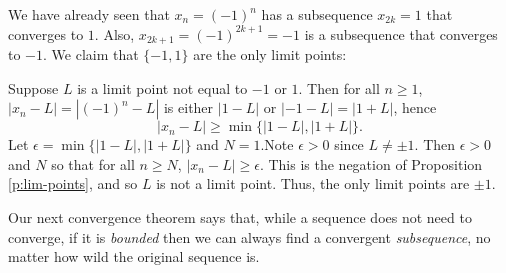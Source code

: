 \documentclass[11pt,dvipsnames]{book}
\def\putgrid{\put(0,0){0}
\put(0,25){25}
\put(0,50){50}
\put(0,75){75}
\put(0,100){100}
\put(0,125){125}
\put(0,150){150}
\put(0,175){175}
\put(0,200){200}
\put(25,0){25}
\put(50,0){50}
\put(75,0){75}
\put(100,0){100}
\put(125,0){125}
\put(150,0){150}
\put(175,0){175}
\put(200,0){200}
\put(225,0){225}
\put(250,0){250}
\put(275,0){275}
\put(300,0){300}
\put(325,0){325}
\put(350,0){350}
\put(375,0){375}
\put(400,0){400}
{\color{gray}\multiput(0,0)(25,0){16}{\line(0,1){200}}}
{\color{gray}\multiput(0,0)(0,25){8}{\line(1,0){400}}}
}
\numberwithin{figure}{section} %
\numberwithin{table}{section} %
\begin{document}
\begin{example}
We have already seen that $x_n=(-1)^{n}$ has a subsequence $x_{2k}=1$ that converges to $1$. Also, $x_{2k+1}=(-1)^{2k+1}=-1$ is a subsequence that converges to $-1$. We claim that $\{-1,1\}$ are the only limit points:

Suppose $L$ is a limit point not equal to $-1$ or $1$. Then for all $n\geq 1$, $|x_{n}-L|=|(-1)^{n}-L|$ is either $|1-L|$ or $|-1-L|=|1+L|$, hence
\[
|x_{n}-L|\geq \min\{|1-L|,|1+L|\}.
\]
Let $\epsilon=\min\{|1-L|,|1+L|\}$ and $N=1$.Note $\epsilon>0$ since $L\neq \pm 1$. Then $\epsilon>0$ and $N$ so that for all $n\geq N$, $|x_{n}-L|\geq \epsilon$. This is the negation of Proposition \ref{p:lim-points}, and so $L$ is not a limit point. Thus, the only limit points are $\pm 1$.

%
\end{example}

Our next convergence theorem says that, while a sequence does not need to converge, if it is {\it bounded} then we can always find a convergent {\it subsequence}, no matter how wild the original sequence is.


\def\putgrid{\put(0,0){0}
\put(0,25){25}
\put(0,50){50}
\put(0,75){75}
\put(0,100){100}
\put(0,125){125}
\put(0,150){150}
\put(0,175){175}
\put(0,200){200}
\put(25,0){25}
\put(50,0){50}
\put(75,0){75}
\put(100,0){100}
\put(125,0){125}
\put(150,0){150}
\put(175,0){175}
\put(200,0){200}
\put(225,0){225}
\put(250,0){250}
\put(275,0){275}
\put(300,0){300}
\put(325,0){325}
\put(350,0){350}
\put(375,0){375}
\put(400,0){400}
{\color{gray}\multiput(0,0)(25,0){16}{\line(0,1){200}}}
{\color{gray}\multiput(0,0)(0,25){8}{\line(1,0){400}}}
}
\end{document}

